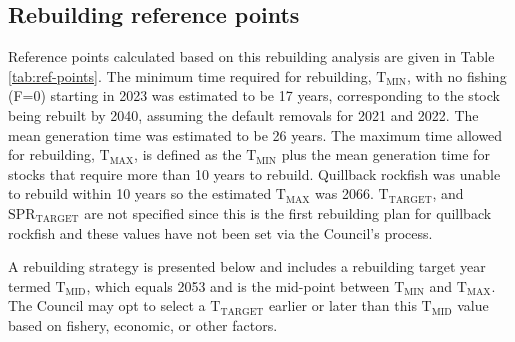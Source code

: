 \documentclass[11pt,
  english,
  a4paper,
]{article}
\begin{document}
\leavevmode\tagmcend\tagstructend


\hypertarget{rebuilding-reference-points}{%
\subsection{Rebuilding reference points}\label{rebuilding-reference-points}}

\leavevmode\tagmcend\tagstructend


Reference points calculated based on this rebuilding analysis are given in Table \ref{tab:ref-points}. The minimum time required for rebuilding, {\(\text{T}_\text{MIN}\)\leavevmode\tagmcend\tagstructend}, with no fishing (F=0) starting in 2023 was estimated to be 17 years, corresponding to the stock being rebuilt by 2040, assuming the default removals for 2021 and 2022. The mean generation time was estimated to be 26 years. The maximum time allowed for rebuilding, {\(\text{T}_\text{MAX}\)\leavevmode\tagmcend\tagstructend}, is defined as the {\(\text{T}_\text{MIN}\)\leavevmode\tagmcend\tagstructend} plus the mean generation time for stocks that require more than 10 years to rebuild. Quillback rockfish was unable to rebuild within 10 years so the estimated {\(\text{T}_\text{MAX}\)\leavevmode\tagmcend\tagstructend} was 2066. {\(\text{T}_\text{TARGET}\)\leavevmode\tagmcend\tagstructend}, and {\(\text{SPR}_\text{TARGET}\)\leavevmode\tagmcend\tagstructend} are not specified since this is the first rebuilding plan for quillback rockfish and these values have not been set via the Council's process.

\leavevmode\tagmcend\tagstructend\par


A rebuilding strategy is presented below and includes a rebuilding target year termed {\(\text{T}_\text{MID}\)\leavevmode\tagmcend\tagstructend}, which equals 2053 and is the mid-point between {\(\text{T}_\text{MIN}\)\leavevmode\tagmcend\tagstructend} and {\(\text{T}_\text{MAX}\)\leavevmode\tagmcend\tagstructend}. The Council may opt to select a {\(\text{T}_\text{TARGET}\)\leavevmode\tagmcend\tagstructend} earlier or later than this {\(\text{T}_\text{MID}\)\leavevmode\tagmcend\tagstructend} value based on fishery, economic, or other factors.
\end{document}
